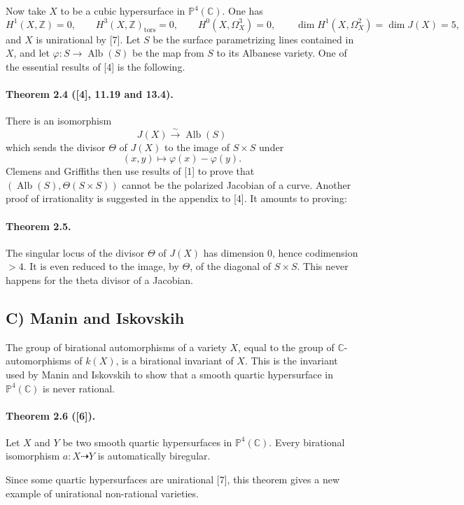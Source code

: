 \documentclass[10pt]{article}
\newcommand{\C}{\mathbb C}
\newcommand{\Pj}{\mathbb P}
\newcommand{\Z}{\mathbb Z}
\newcommand{\Alb}{\operatorname{Alb}}
\newcommand{\tors}{\operatorname{tors}}
\newcommand{\iso}{\xrightarrow{\sim}}
\begin{document}
Now take \(X\) to be a cubic hypersurface in \(\Pj^4(\C)\). One has
\[
H^1(X,\Z)=0,
\qquad H^3(X,\Z)_{\tors}=0,
\qquad H^0(X,\Omega_X^3)=0,
\qquad \dim H^1(X,\Omega_X^2)=\dim J(X)=5,
\]
and \(X\) is unirational by [7]. Let \(S\) be the surface parametrizing lines contained in \(X\), and let \(\varphi:S\to\Alb(S)\) be the map from \(S\) to its Albanese variety. One of the essential results of [4] is the following.

\paragraph{Theorem 2.4 ([4], 11.19 and 13.4).} There is an isomorphism
\[
J(X)\iso \Alb(S)
\]
which sends the divisor \(\Theta\) of \(J(X)\) to the image of \(S\times S\) under
\[
(x,y)\longmapsto \varphi(x)-\varphi(y).
\]
Clemens and Griffiths then use results of [1] to prove that \((\Alb(S),\Theta(S\times S))\) cannot be the polarized Jacobian of a curve. Another proof of irrationality is suggested in the appendix to [4]. It amounts to proving:

\paragraph{Theorem 2.5.} The singular locus of the divisor \(\Theta\) of \(J(X)\) has dimension \(0\), hence codimension \(>4\). It is even reduced to the image, by \(\Theta\), of the diagonal of \(S\times S\). This never happens for the theta divisor of a Jacobian.

\subsection*{C) Manin and Iskovskih}

The group of birational automorphisms of a variety \(X\), equal to the group of \(\C\)-automorphisms of \(k(X)\), is a birational invariant of \(X\). This is the invariant used by Manin and Iskovskih to show that a smooth quartic hypersurface in \(\Pj^4(\C)\) is never rational.

\paragraph{Theorem 2.6 ([6]).} Let \(X\) and \(Y\) be two smooth quartic hypersurfaces in \(\Pj^4(\C)\). Every birational isomorphism \(a:X\dashrightarrow Y\) is automatically biregular.

Since some quartic hypersurfaces are unirational [7], this theorem gives a new example of unirational non-rational varieties.
\end{document}
